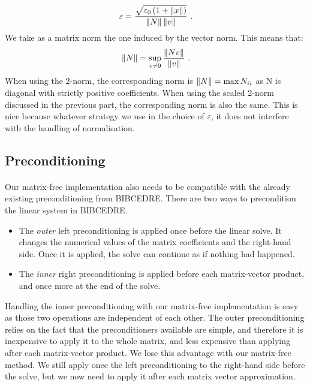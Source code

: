       \begin{equation}
        \varepsilon = \frac{\sqrt{\varepsilon_0 \left(1 + \norm{x}\right) }}{\norm{N} \norm{v}} \ .
      \end{equation}
      We take as a matrix norm the one induced by the vector norm.
      This means that:
      \begin{equation}
        \norm{N} = \sup_{v \ne 0} \frac{\norm{Nv}}{\norm{v}} \ .
      \end{equation}
      When using the 2-norm, the corresponding norm is $\norm{N} = \max{N_{ii}}$ as N is diagonal with strictly positive coefficients.
      When using the scaled 2-norm discussed in the previous part, the corresponding norm is also the same.
      This is nice because whatever strategy we use in the choice of $\varepsilon$, it does not interfere with the handling of normalisation.


    \subsection{Preconditioning}

      \paragraph{}
      Our matrix-free implementation also needs to be compatible with the already existing preconditioning from BIBCEDRE.
      There are two ways to precondition the linear system in BIBCEDRE.
      \begin{itemize}
        \item The \emph{outer} left preconditioning is applied once before the linear solve.
          It changes the numerical values of the matrix coefficients and the right-hand side.
          Once it is applied, the solve can continue as if nothing had happened.
        \item The \emph{inner} right preconditioning is applied before each matrix-vector product, and once more at the end of the solve.
      \end{itemize}
      Handling the inner preconditioning with our matrix-free implementation is easy as those two operations are independent of each other.
      The outer preconditioning relies on the fact that the preconditioners available are simple, and therefore it is inexpensive to apply it to the whole matrix, and less expensive than applying after each matrix-vector product.
      We lose this advantage with our matrix-free method.
      We still apply once the left preconditioning to the right-hand side before the solve, but we now need to apply it after each matrix vector approximation.



